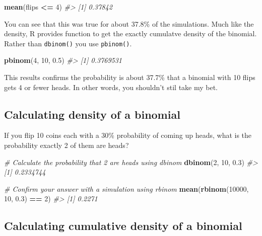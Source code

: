 \documentclass[]{article}
\newenvironment{Shaded}{\begin{snugshade}}{\end{snugshade}}
\newcommand{\CommentTok}[1]{\textcolor[rgb]{0.56,0.35,0.01}{\textit{#1}}}
\newcommand{\DecValTok}[1]{\textcolor[rgb]{0.00,0.00,0.81}{#1}}
\newcommand{\FloatTok}[1]{\textcolor[rgb]{0.00,0.00,0.81}{#1}}
\newcommand{\KeywordTok}[1]{\textcolor[rgb]{0.13,0.29,0.53}{\textbf{#1}}}
\newcommand{\NormalTok}[1]{#1}
\newcommand{\OperatorTok}[1]{\textcolor[rgb]{0.81,0.36,0.00}{\textbf{#1}}}
\newcommand{\StringTok}[1]{\textcolor[rgb]{0.31,0.60,0.02}{#1}}
\begin{document}
\begin{Shaded}
\begin{Highlighting}[]
\KeywordTok{mean}\NormalTok{(flips }\OperatorTok{<=}\StringTok{ }\DecValTok{4}\NormalTok{)}
\CommentTok{#> [1] 0.37842}
\end{Highlighting}
\end{Shaded}

You can see that this was true for about 37.8\% of the simulations. Much
like the density, R provides function to get the exactly cumulatve
density of the binomial. Rather than \texttt{dbinom()} you use
\texttt{pbinom()}.

\begin{Shaded}
\begin{Highlighting}[]
\KeywordTok{pbinom}\NormalTok{(}\DecValTok{4}\NormalTok{, }\DecValTok{10}\NormalTok{, }\FloatTok{0.5}\NormalTok{)}
\CommentTok{#> [1] 0.3769531}
\end{Highlighting}
\end{Shaded}

This results confirms the probability is about 37.7\% that a binomial
with 10 flips gets 4 or fewer heads. In other words, you shouldn't stil
take my bet.

\hypertarget{calculating-density-of-a-binomial}{%
\subsection{Calculating density of a
binomial}\label{calculating-density-of-a-binomial}}

If you flip 10 coins each with a 30\% probability of coming up heads,
what is the probability exactly 2 of them are heads?

\begin{Shaded}
\begin{Highlighting}[]
\CommentTok{# Calculate the probability that 2 are heads using dbinom}
\KeywordTok{dbinom}\NormalTok{(}\DecValTok{2}\NormalTok{, }\DecValTok{10}\NormalTok{, }\FloatTok{0.3}\NormalTok{)}
\CommentTok{#> [1] 0.2334744}

\CommentTok{# Confirm your answer with a simulation using rbinom}
\KeywordTok{mean}\NormalTok{(}\KeywordTok{rbinom}\NormalTok{(}\DecValTok{10000}\NormalTok{, }\DecValTok{10}\NormalTok{, }\FloatTok{0.3}\NormalTok{) }\OperatorTok{==}\StringTok{ }\DecValTok{2}\NormalTok{)}
\CommentTok{#> [1] 0.2271}
\end{Highlighting}
\end{Shaded}

\hypertarget{calculating-cumulative-density-of-a-binomial}{%
\subsection{Calculating cumulative density of a
binomial}\label{calculating-cumulative-density-of-a-binomial}}
\end{document}
